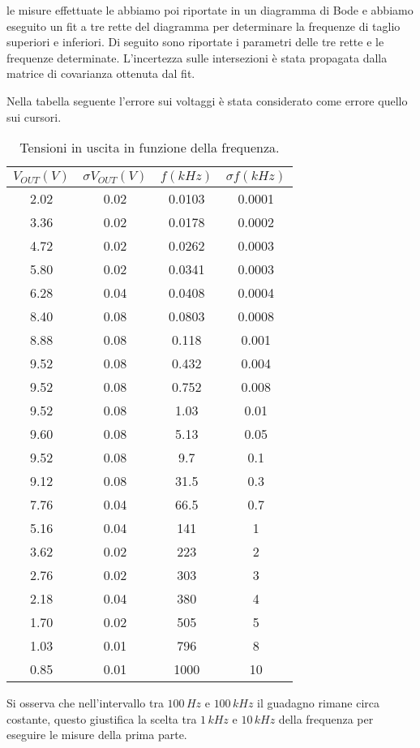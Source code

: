 \documentclass[10pt,a4paper]{article}
\begin{document}
le misure effettuate le abbiamo poi riportate in un diagramma di Bode e abbiamo eseguito un fit a tre rette del diagramma per determinare la frequenze di taglio superiori e inferiori. Di seguito sono riportate i parametri delle tre rette e le frequenze determinate. L'incertezza sulle intersezioni è stata propagata dalla matrice di covarianza ottenuta dal fit. 

Nella tabella seguente l'errore sui voltaggi è stata considerato come errore quello sui cursori.

\begin{table}[!htb]\centering
\begin{tabular}{|c|c|c|c|}
\hline
$V_{OUT} (V)$ & $\sigma V_{OUT} (V)$ & $f(kHz)$ & $\sigma f (kHz)$\\
\hline
2.02 & 0.02 & 0.0103 & 0.0001\\
3.36 & 0.02 & 0.0178 & 0.0002\\
4.72 & 0.02 & 0.0262 & 0.0003\\
5.80 & 0.02 & 0.0341 & 0.0003\\
6.28 & 0.04 & 0.0408 & 0.0004\\
8.40 & 0.08 & 0.0803 & 0.0008\\
8.88 & 0.08 & 0.118 & 0.001\\
9.52 & 0.08 & 0.432 & 0.004\\
9.52 & 0.08 & 0.752 & 0.008\\
9.52 & 0.08 & 1.03 & 0.01\\
9.60 & 0.08 & 5.13 & 0.05\\
9.52 & 0.08 & 9.7 & 0.1\\
9.12 & 0.08 & 31.5 & 0.3\\
7.76 & 0.04 & 66.5 & 0.7\\
5.16 & 0.04 & 141 & 1\\
3.62 & 0.02 & 223 & 2\\
2.76 & 0.02 & 303 & 3\\
2.18 & 0.04 & 380 & 4\\
1.70 & 0.02 & 505 & 5\\
1.03 & 0.01 & 796 & 8\\
0.85 & 0.01 & 1000 & 10\\
\hline
\end{tabular}
\caption{Tensioni in uscita in funzione della frequenza.}
\label{bode}
\end{table}

Si osserva che nell'intervallo tra $100\,Hz$ e $100\,kHz$ il guadagno rimane circa costante, questo giustifica la scelta tra $1 \, kHz$ e $10 \, kHz$ della frequenza per eseguire le misure della prima parte.
\end{document}
